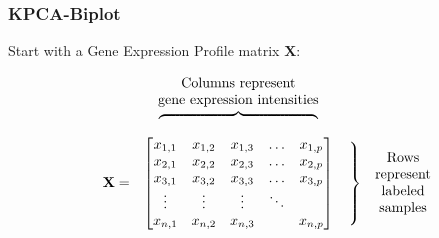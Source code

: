 \documentclass[serif ]{beamer}
\begin{document}
	\begin{frame}
		\frametitle{}
	\end{frame}
	


	\begin{frame}
		\frametitle{KPCA-Biplot}
			Start with a Gene Expression Profile matrix $\mathbf{X}$:

			\begin{equation}			
			\begin{matrix}
			& & \text{Columns represent} & & \\
			& & \text{gene expression intensities} & & \\
			& & \rotatebox[origin=c]{270}{$\begin{cases} & \\  & \\ & \\ & \\ &  \\ & \\ &  \\  & \\ \end{cases}$} & & \\
			&\mathbf{X}=  
			&       \begin{bmatrix}
					x_{1,1} & x_{1,2} & x_{1,3} & \ldots  & x_{1,p} \\ 
					x_{2,1} & x_{2,2} & x_{2,3} & \ldots  & x_{2,p} \\ 
					x_{3,1} & x_{3,2} & x_{3,3} & \ldots  & x_{3,p} \\ 
					\vdots   & \vdots   & \vdots   & \ddots  &              \\ 
					x_{n,1} & x_{n,2} & x_{n,3} &            & x_{n,p} \\ 
				\end{bmatrix}
			&\left.\begin{matrix}\\ \\ \\ \\ \\  \end{matrix}\right\}
                                & \rotatebox[origin=c]{0}{$ \begin{matrix} 
						                    \text{Rows}        \\
							          \text{represent} \\ 
							          \text{labeled}     \\
							          \text{samples}    \\ 
                                                                               \end{matrix}$} \\


\end{matrix}
\end{equation}
\end{frame}
\end{document}
